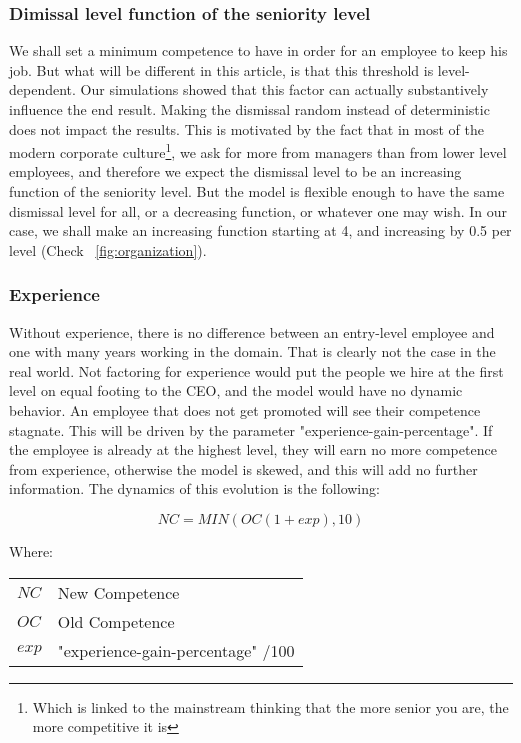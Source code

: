 \documentclass[11pt]{article}
\begin{document}
\subsubsection{Dimissal level function of the seniority level}
\label{dismissal}
We shall set a minimum competence to have in order for an employee to keep his job. But what will be different in this article, is that this threshold is level-dependent. Our simulations showed that this factor can actually substantively influence the end result. Making the dismissal random instead of deterministic does not impact the results. This is motivated by the fact that in most of the modern corporate culture\footnote{Which is linked to the mainstream thinking that the more senior you are, the more competitive it is}, we ask for more from managers than from lower level employees, and therefore we expect the dismissal level to be an increasing function of the seniority level. But the model is flexible enough to have the same dismissal level for all, or a decreasing function, or whatever one may wish. In our case, we shall make an increasing function starting at 4, and increasing by 0.5 per level (Check ~\ref{fig:organization}).

\subsubsection{Experience}
\label{experience}
Without experience, there is no difference between an entry-level employee and one with many years working in the domain. That is clearly not the case in the real world. Not factoring for experience would put the people we hire at the first level on equal footing to the CEO, and the model would have no dynamic behavior. An employee that does not get promoted will see their competence stagnate. This will be driven by the parameter "experience-gain-percentage". If the employee is already at the highest level, they will earn no more competence from experience, otherwise the model is skewed, and this will add no further information. The dynamics of this evolution is the following:

\begin{equation}
NC = MIN(OC(1 + exp), 10)
\end{equation}

Where:

\begin{tabular}{l l}
$NC$  & New Competence \\
$OC$  & Old Competence \\
$exp$ & "experience-gain-percentage"  /100 \\
\end{tabular}
\end{document}
